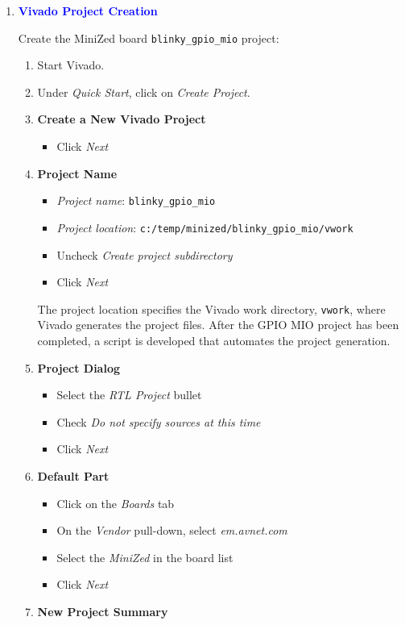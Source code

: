 \begin{enumerate}
\item \textcolor{blue}{\textbf{Vivado Project Creation}}

Create the MiniZed board \verb+blinky_gpio_mio+ project:
%
\begin{enumerate}
\item Start Vivado.
\item Under \emph{Quick Start}, click on \emph{Create Project}.
\item {\bf Create a New Vivado Project}
%
\begin{itemize}
\item Click \emph{Next}
\end{itemize}
%
\item {\bf Project Name}
%
\begin{itemize}
\item \emph{Project name}: \verb+blinky_gpio_mio+
\item \emph{Project location}: \verb+c:/temp/minized/blinky_gpio_mio/vwork+
\item Uncheck \emph{Create project subdirectory}
\item Click \emph{Next}
\end{itemize}
%
The project location specifies the Vivado work directory, \verb+vwork+,
where Vivado generates the project files. After the GPIO MIO project has
been completed, a script is developed that automates the project generation.
%
\item {\bf Project Dialog}
%
\begin{itemize}
\item Select the \emph{RTL Project} bullet
\item Check \emph{Do not specify sources at this time}
\item Click \emph{Next}
\end{itemize}
%
\item {\bf Default Part}
%
\begin{itemize}
\item Click on the \emph{Boards} tab
\item On the \emph{Vendor} pull-down, select \emph{em.avnet.com}
\item Select the \emph{MiniZed} in the board list
\item Click \emph{Next}
\end{itemize}
%
\item {\bf New Project Summary}

\end{enumerate}
\end{enumerate}
